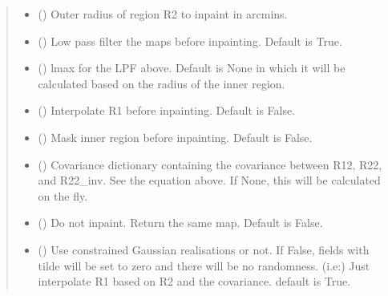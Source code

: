 \documentclass[letterpaper,10pt,english]{sphinxmanual}
\begin{document}
\begin{fulllineitems}
\begin{quote}
\begin{description}
\begin{itemize}
\item {} 
\sphinxAtStartPar
{} () \textendash{} Outer radius of region R2 to inpaint in arcmins.

\item {} 
\sphinxAtStartPar
{} () \textendash{} Low pass filter the maps before inpainting.
Default is True.

\item {} 
\sphinxAtStartPar
{} () \textendash{} lmax for the LPF above.
Default is None in which it will be calculated based on the radius of the inner region.

\item {} 
\sphinxAtStartPar
{} () \textendash{} Interpolate R1 before inpainting.
Default is False.

\item {} 
\sphinxAtStartPar
{} () \textendash{} Mask inner region before inpainting.
Default is False.

\item {} 
\sphinxAtStartPar
{} (\sphinxstyleliteralemphasis{\sphinxupquote{ (}}\sphinxstyleliteralemphasis{\sphinxupquote{)}}) \textendash{} Covariance dictionary containing the covariance between R12, R22, and R22\_inv.
See the equation above.
If None, this will be calculated on the fly.

\item {} 
\sphinxAtStartPar
{} () \textendash{} Do not inpaint. Return the same map.
Default is False.

\item {} 
\sphinxAtStartPar
{} () \textendash{} Use constrained Gaussian realisations or not.
If False, fields with tilde will be set to zero and there will be no randomness.
(i.e:) Just interpolate R1 based on R2 and the covariance.
default is True.


\end{itemize}
\end{description}
\end{quote}
\end{fulllineitems}
\end{document}
